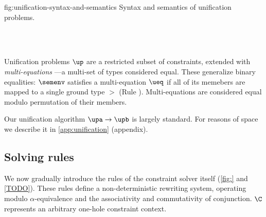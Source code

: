 \documentclass[acmsmall,screen,nonacm,review]{acmart}
\begin{document}
\begin{mathparfig}[htpb!]
  {fig:unification-syntax-and-semantics}
  {Syntax and semantics of unification problems.
  }
\begin{minipage}[t]{0.45\textwidth}
\begin{bnfgrammar}
   \\
   \\
  \entry[Constraints]{\c}{
    \dots \and \ueq
  }
\end{bnfgrammar}
\end{minipage}
\hspace{0.3\textwidth}
\begin{minipage}[t]{0.45\textwidth}
    {\semenv \th \ueq}
\end{minipage}
\end{mathparfig}


Unification problems $\up$ are a restricted subset of constraints, extended
with \emph{multi-equations} \citep{Pottier-Remy/emlti}---a multi-set of types
considered equal. These generalize binary equalities: $\semenv$ satisfies a
multi-equation $\ueq$ if all of its memebers are mapped to a single ground type
$\gt$ (Rule ). Multi-equations are considered equal modulo
permutation of their members.


Our unification algorithm $\upa \to \upb$ is largely standard. For reasons of space we describe it in \cref{app:unification} (appendix).

\subsection{Solving rules}


We now gradually introduce the rules of the constraint solver itself (\cref{fig:}
and \cref{TODO}).
These rules define a non-deterministic rewriting
system, operating modulo $\alpha$-equivalence and the associativity and
commutativity of conjunction. $\C$ represents an arbitrary
one-hole constraint context.
\end{document}
